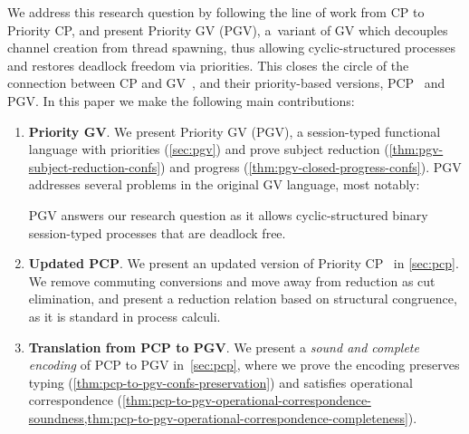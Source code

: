 \documentclass[main.tex]{subfiles}
\begin{document}
We address this research question by following the line of work from CP to Priority CP, and present
Priority GV (PGV), a~variant of GV which decouples channel creation from thread spawning, thus allowing cyclic-structured processes and restores deadlock freedom via priorities. This closes the circle of the connection between CP and GV~\cite{wadler14}, and their priority-based versions, PCP~\cite{dardhagay18} and PGV.%
In this paper we make the following main contributions:
\begin{enumerate}
	\item \textbf{Priority GV}. We present Priority GV (PGV), a session-typed functional language with priorities (\cref{sec:pgv}) and prove subject reduction (\cref{thm:pgv-subject-reduction-confs}) and progress (\cref{thm:pgv-closed-progress-confs}).
	PGV addresses several problems in the original GV language, most notably:
	PGV answers our research question as it allows cyclic-structured binary session-typed processes that are deadlock free.
	\item \textbf{Updated PCP}. We present an updated version of Priority CP~\cite{dardhagay18} in \cref{sec:pcp}. We remove commuting conversions and move away from reduction as cut elimination, and present a reduction relation based on structural congruence, as it is standard in process calculi.
	\item \textbf{Translation from PCP to PGV}. We present a \emph{sound and complete encoding} of PCP to PGV in~\cref{sec:pcp}, where we prove the encoding preserves typing (\cref{thm:pcp-to-pgv-confs-preservation}) and satisfies operational correspondence (\cref{thm:pcp-to-pgv-operational-correspondence-soundness,thm:pcp-to-pgv-operational-correspondence-completeness}).
\end{enumerate}
\end{document}
